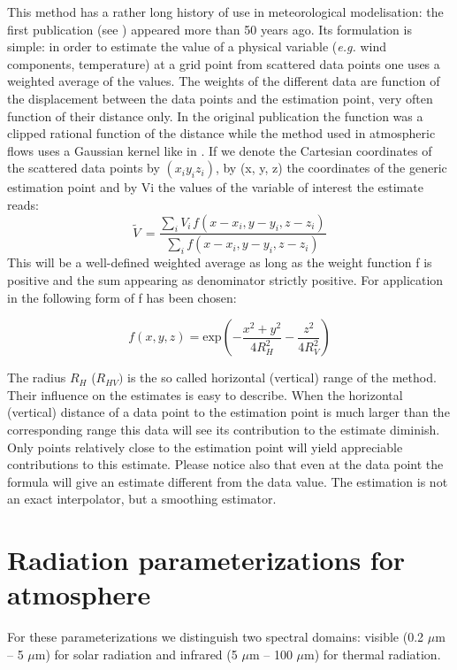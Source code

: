 This method has a rather long history of use in meteorological
modelisation: the first publication (see \cite{Cressman:1959}) appeared more than 50 years ago.
Its formulation is simple: in order to estimate the value of a physical variable (\emph{e.g.} wind components, temperature)
at a grid point from scattered data points one uses a weighted average of the values.
The weights of the different data are function of the displacement between
the data points and the estimation point, very often function of their
distance only. In the original publication the function was a clipped
rational function of the distance while the method used in \CS
atmospheric flows uses a Gaussian kernel like in \cite{Barnes:1964}.
If we denote the Cartesian coordinates of the scattered data points by
$(x_{i}y_{i}z_{i})$, by (x, y, z) the coordinates of the generic estimation
point and by Vi the values of the variable of interest the estimate reads:
\begin{equation}
\tilde{V}\, =\frac{\sum\nolimits_i {V_{i\, }f(x-x_{i},y-y_{i},z-z_{i})}
}{\sum\nolimits_i {f(x-x_{i},y-y_{i},z-z_{i})} }
\end{equation}
This will be a well-defined weighted average as long as the weight function
f is positive and the sum appearing as denominator strictly positive. For
application in \CS the following form of f has been chosen:

\begin{equation}
f\left( x,y,z \right)=
\mathrm{exp}(-\frac{x^{2}+y^{2}}{4R_{H}^{2}}-\frac{z^{2}}{4R_{V}^{2}})
\end{equation}

The radius $R_{H}$ ($R_{HV})$ is the so called horizontal (vertical) range
of the method. Their influence on the estimates is easy to describe. When
the horizontal (vertical) distance of a data point to the estimation point
is much larger than the corresponding range this data will see its
contribution to the estimate diminish. Only points relatively close to the
estimation point will yield appreciable contributions to this estimate.
Please notice also that even at the data point the formula will give an
estimate different from the data value. The estimation is not an exact
interpolator, but a smoothing estimator.

\section{Radiation parameterizations for atmosphere}

For these parameterizations we distinguish two spectral domains: visible
(0.2 $\mu$m -- 5 $\mu$m) for solar radiation and infrared (5 $\mu$m
-- 100 $\mu$m) for thermal radiation.

